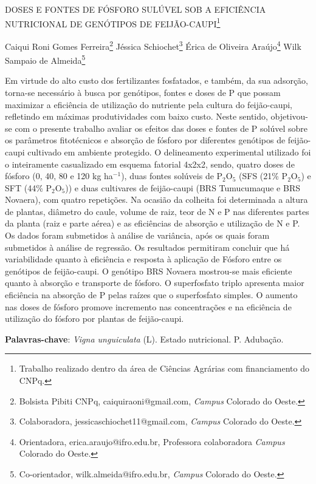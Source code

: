 \documentclass[article,12pt,onesidea,4paper,english,brazil]{abntex2}
\begin{document}
	
	
	\frenchspacing 
	
	\begin{center}
		\LARGE DOSES E FONTES DE FÓSFORO SULÚVEL SOB A EFICIÊNCIA NUTRICIONAL
		DE GENÓTIPOS DE FEIJÃO-CAUPI\footnote{Trabalho realizado dentro da área de Ciências Agrárias com financiamento do CNPq.}
		
		\normalsize
		Caiqui Roni Gomes Ferreira\footnote{Bolsista Pibiti CNPq, caiquiraoni@gmail.com, \textit{Campus} Colorado do Oeste.} 
		Jéssica Schiochet\footnote{Colaboradora, jessicaschiochet11@gmail.com, \textit{Campus} Colorado do Oeste.} 
		Érica de Oliveira Araújo\footnote{Orientadora, erica.araujo@ifro.edu.br, Professora colaboradora \textit{Campus} Colorado do Oeste.} 
		Wilk Sampaio de Almeida\footnote{Co-orientador, wilk.almeida@ifro.edu.br, \textit{Campus} Colorado do Oeste.} 
	\end{center}
	
	\noindent Em virtude do alto custo dos fertilizantes fosfatados, e também, da sua adsorção,
	torna-se necessário à busca por genótipos, fontes e doses de P que possam
	maximizar a eficiência de utilização do nutriente pela cultura do feijão-caupi,
	refletindo em máximas produtividades com baixo custo. Neste sentido, objetivou-se
	com o presente trabalho avaliar os efeitos das doses e fontes de P solúvel sobre os
	parâmetros fitotécnicos e absorção de fósforo por diferentes genótipos de feijão-
	caupi cultivado em ambiente protegido. O delineamento experimental utilizado foi o
	inteiramente casualizado em esquema fatorial 4x2x2, sendo, quatro doses de fósforo
	(0, 40, 80 e 120 kg ha$^{-1}$), duas fontes solúveis de P$_2$O$_5$ (SFS (21\% P$_2$O$_5$) e SFT (44\% P$_2$O$_5$)) e duas cultivares de feijão-caupi (BRS Tumucumaque e BRS Novaera), com
	quatro repetições. Na ocasião da colheita foi determinada a altura de plantas,
	diâmetro do caule, volume de raiz, teor de N e P nas diferentes partes da planta (raiz
	e parte aérea) e as eficiências de absorção e utilização de N e P. Os dados foram
	submetidos à análise de variância, após os quais foram submetidos à análise de
	regressão. Os resultados permitiram concluir que há variabilidade quanto à eficiência
	e resposta à aplicação de Fósforo entre os genótipos de feijão-caupi. O genótipo
	BRS Novaera mostrou-se mais eficiente quanto à absorção e transporte de fósforo.
	O superfosfato triplo apresenta maior eficiência na absorção de P pelas raízes que o
	superfosfato simples. O aumento nas doses de fósforo promove incremento nas
	concentrações e na eficiência de utilização do fósforo por plantas de feijão-caupi.
	
	\vspace{\onelineskip}
	
	\noindent
	\textbf{Palavras-chave}: \textit{Vigna unguiculata} (L). Estado nutricional. P. Adubação.
	
\end{document}
